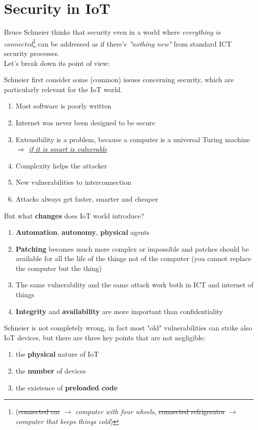 \section{Security in IoT}
Bruce Schneier thinks that
security even in a world where \textit{everything is connected}\footnote{(\st{connected car} $\longrightarrow$ \textit{computer with four wheels}, \st{connected refrigerator} $\longrightarrow$ \textit{computer that keeps things cold})} can be addressed as if there's \textit{"nothing new"} from standard ICT security processes.\\
Let's break down its point of view:

Schneier first consider some (common) issues concerning security, which are particularly relevant for the IoT world.
\begin{enumerate}
   \item Most software is poorly written
   \item Internet was never been designed to be secure
   \item Extensibility is a problem, because a computer is a universal Turing machine $\Longrightarrow$ \textit{\ul{if it is smart is vulnerable}}
   \item Complexity helps the attacker
   \item New vulnerabilities to interconnection
   \item Attacks always get faster, smarter and cheaper
\end{enumerate}


But what \textbf{changes} does IoT world introduce?
\begin{enumerate}
   \item \textbf{Automation}, \textbf{autonomy}, \textbf{physical} agents
   \item \textbf{Patching} becomes much more complex or impossible and
   patches should be available for all the life of the things not of
   the computer (you cannot replace the computer but the thing)
   \item The same vulnerability and the same attack work both in ICT
   and internet of things
   \item \textbf{Integrity} and \textbf{availability} are more important than
   confidentiality
\end{enumerate}

Schneier is not completely wrong,
in fact most "old" vulnerabilities can strike also IoT devices, but there are three key points that are not negligible:
\begin{enumerate}
   \item the \textbf{physical} nature of IoT
   \item the \textbf{number} of devices
   \item the existence of \textbf{preloaded code}
\end{enumerate}
\nl

